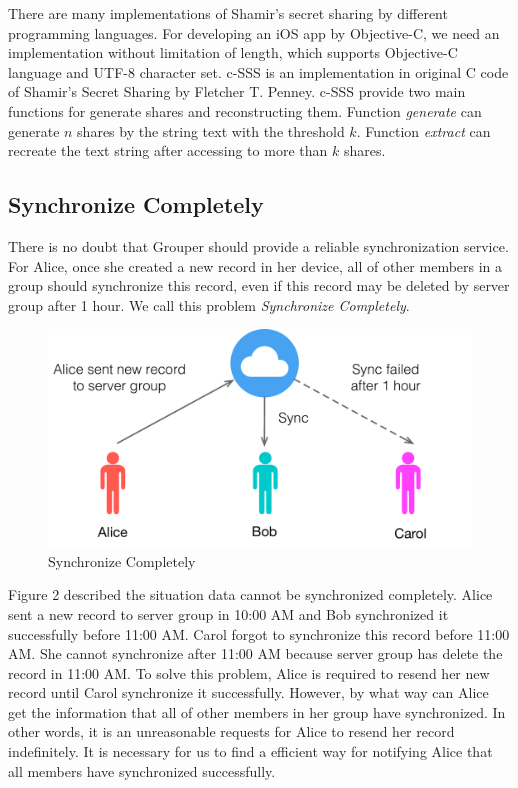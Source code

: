 \documentclass[twocolumn,10pt]{article}
\begin{document}
There are many implementations of Shamir's secret sharing by different programming languages. For developing an iOS app by Objective-C, we need an implementation without limitation of length, which supports Objective-C language and UTF-8 character set. c-SSS\cite{c-sss} is an implementation in original C code of Shamir's Secret Sharing by Fletcher T. Penney. c-SSS provide two main functions for generate shares and reconstructing them. Function \emph{generate} can generate $n$ shares by the string text with the threshold $k$. Function \emph{extract} can recreate the text string after accessing to more than $k$ shares.

\subsection{Synchronize Completely}
There is no doubt that Grouper should provide a reliable synchronization service. For Alice, once she created a new record in her device, all of other members in a group should synchronize this record, even if this record may be deleted by server group after 1 hour. We call this problem \emph{Synchronize Completely}.

\begin{figure}[t]
\centering
\includegraphics[scale=0.4]{sync_completely}
\caption{Synchronize Completely}
\end{figure}

Figure 2 described the situation data cannot be synchronized completely. Alice sent a new record to server group in 10:00 AM and Bob synchronized it successfully before 11:00 AM. Carol forgot to synchronize this record before 11:00 AM. She cannot synchronize after 11:00 AM because server group has delete the record in 11:00 AM. To solve this problem, Alice is required to resend her new record until Carol synchronize it successfully. However, by what way can Alice get the information that all of other members in her group have synchronized. In other words, it is an unreasonable requests for Alice to resend her record indefinitely. It is necessary for us to find a efficient way for notifying Alice that all members have synchronized successfully.
\end{document}
